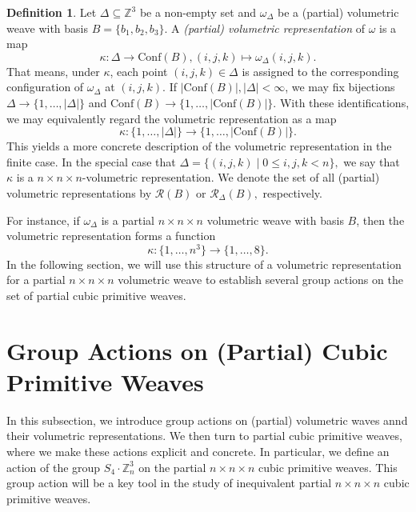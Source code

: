 \documentclass[12pt]{article}
\theoremstyle{definition}
\newtheorem{definition}[theorem]{Definition}
\theoremstyle{remark}
\begin{document}
\begin{definition}\label{def:volrep}
Let ${\Delta}\subseteq \mathbb{Z}^3$ be a non-empty set and $\omega_{\Delta}$ be a (partial) volumetric weave with basis $B=\{b_1,b_2,b_3\}$. A \emph{(partial) volumetric representation} of $\omega$ is a map
\[
\kappa:{\Delta} \to \mathrm{Conf}(B),(i,j,k)\mapsto \omega_{\Delta}(i,j,k).
\]
That means, under $\kappa$, each point $(i,j,k)\in {\Delta}$ is assigned to the corresponding configuration of $\omega_{\Delta}$ at $(i,j,k)$.
If $\vert\mathrm{Conf}(B)\vert, \vert{\Delta}\vert < \infty$, we may fix bijections ${\Delta} \to \{1,\ldots, \vert{\Delta}\vert\}$ and $\mathrm{Conf}(B) \to \{1,\ldots, \vert\mathrm{Conf}(B)\vert\}$. With these identifications, we may equivalently regard the volumetric representation as a map
\[
\kappa:\{1,\ldots, \vert {\Delta}\vert \} \to \{1,\ldots,\vert\mathrm{Conf}(B)\vert\}.
\]
This yields a more concrete description of the volumetric representation in the finite case.
In the special case that ${\Delta}=\{(i,j,k)\mid 0\leq i,j,k<n \},$ we say that  $\kappa$ is a $n\times n\times n$-volumetric representation. We denote the set of all (partial) volumetric representations by $\mathcal{R}(B)$ or $\mathcal{R}_\Delta(B),$ respectively.
\end{definition}

For instance, if $\omega_{\Delta}$ is a partial $n\times n\times n$ volumetric weave with basis $B$, then the volumetric representation forms a function $$\kappa:\{1,\ldots,n^3\}\to \{1,\ldots,8\}.$$
In the following section, we will use this structure of a volumetric representation for a partial $n\times n\times n$ volumetric weave to establish several group actions on the set of partial cubic primitive weaves.




\section{Group Actions on (Partial) Cubic Primitive Weaves}\label{sec:actions}

In this subsection, we introduce group actions on (partial) volumetric waves annd their volumetric representations.
We then turn to partial cubic primitive weaves, where we make these actions explicit and concrete.
In particular, we define an action of the group $S_4 \cdot \mathbb{Z}_n^3$ on the partial $n\times n\times n$ cubic primitive weaves. This group action will be a key tool in the study of inequivalent partial $n \times n \times n$ cubic primitive weaves.
\end{document}
